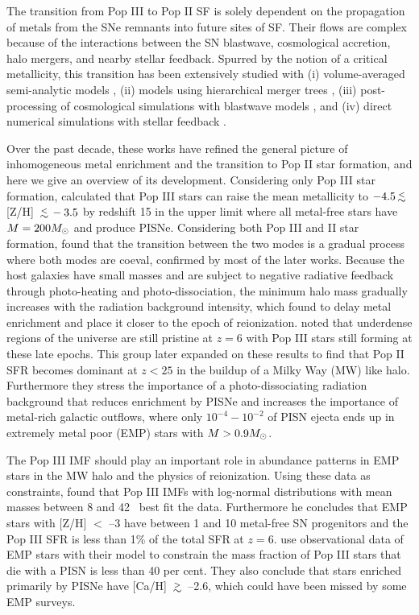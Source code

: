 \documentclass[12pt,preprint]{aastex}
\begin{document}
The transition from Pop III to Pop II SF is solely dependent on the
propagation of metals from the SNe remnants into future sites of SF.
Their flows are complex because of the interactions between the SN
blastwave, cosmological accretion, halo mergers, and nearby stellar
feedback.  Spurred by the notion of a critical metallicity, this
transition has been extensively studied with (i) volume-averaged
semi-analytic models \citep{Scannapieco03, Yoshida04,
  Furlanetto05_Reion}, (ii) models using hierarchical merger trees
\citep{Tumlinson06, Tumlinson10, Salvadori07, Komiya10}, (iii)
post-processing of cosmological simulations with blastwave models
\citep{Karlsson08, Trenti09, Trenti10}, and (iv) direct numerical
simulations with stellar feedback \citep{Tornatore07, Ricotti08,
  Maio10_Pop32, Maio11_Enrich}.

Over the past decade, these works have refined the general picture of
inhomogeneous metal enrichment and the transition to Pop II star
formation, and here we give an overview of its development.
Considering only Pop III star formation, \citeauthor{Yoshida04}
calculated that Pop III stars can raise the mean metallicity to $-4.5
\lsim$ [Z/H] $\lsim -3.5$ by redshift 15 in the upper limit where all
metal-free stars have $M = 200 \Ms$ and produce PISNe.  Considering
both Pop III and II star formation, \citeauthor{Scannapieco03} found
that the transition between the two modes is a gradual process where
both modes are coeval, confirmed by most of the later works.  Because
the host galaxies have small masses and are subject to negative
radiative feedback through photo-heating and photo-dissociation, the
minimum halo mass gradually increases with the radiation background
intensity, which \citeauthor{Furlanetto05_Reion} found to delay metal
enrichment and place it closer to the epoch of reionization.
\citeauthor{Trenti09} noted that underdense regions of the universe
are still pristine at $z=6$ with Pop III stars still forming at these
late epochs.  This group later expanded on these results to find that
Pop II SFR becomes dominant at $z<25$ in the buildup of a Milky Way
(MW) like halo.  Furthermore they stress the importance of a
photo-dissociating radiation background that reduces enrichment by
PISNe and increases the importance of metal-rich galactic outflows,
where only $10^{-4} - 10^{-2}$ of PISN ejecta ends up in extremely
metal poor (EMP) stars with $M > 0.9 \Ms$.

The Pop III IMF should play an important role in abundance patterns in
EMP stars in the MW halo and the physics of reionization.  Using these
data as constraints, \citeauthor{Tumlinson06} found that Pop III IMFs
with log-normal distributions with mean masses between 8 and 42
\Ms~best fit the data.  Furthermore he concludes that EMP stars with
[Z/H] $<$ --3 have between 1 and 10 metal-free SN progenitors and
the Pop III SFR is less than 1\% of the total SFR at $z=6$.
\citeauthor{Karlsson08} use observational data of EMP stars with
their model to constrain the mass fraction of Pop III stars that
die with a PISN is less than 40 per cent.  They also conclude that
stars enriched primarily by PISNe have [Ca/H] $\gsim$ --2.6, which
could have been missed by some EMP surveys.
\end{document}
